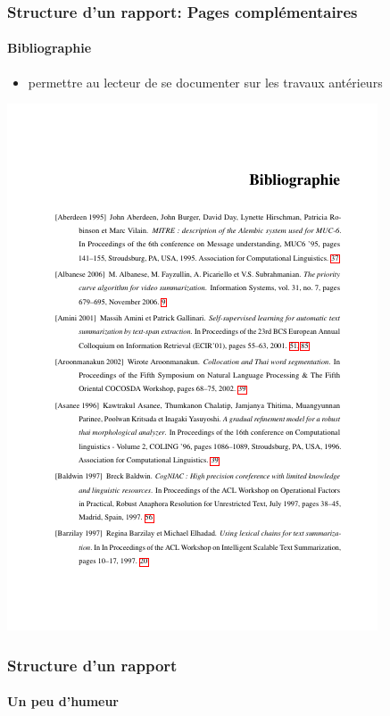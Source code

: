 \documentclass[xcolor=table]{beamer}
\begin{document}
\begin{frame}
\frametitle{Structure d'un rapport: Pages complémentaires}
\framesubtitle{Bibliographie}

\begin{minipage}{0.52\textwidth}
	\begin{itemize}
		\item permettre au lecteur de se documenter sur les travaux antérieurs
	\end{itemize}
\end{minipage}
\begin{minipage}{0.42\textwidth}
	\includegraphics[width=\textwidth]{..//img/Bweb03-redaction/bibliographie.png}
\end{minipage}

\end{frame}

\begin{frame}
\frametitle{Structure d'un rapport}
\framesubtitle{Un peu d'humeur}


\end{frame}
\end{document}
